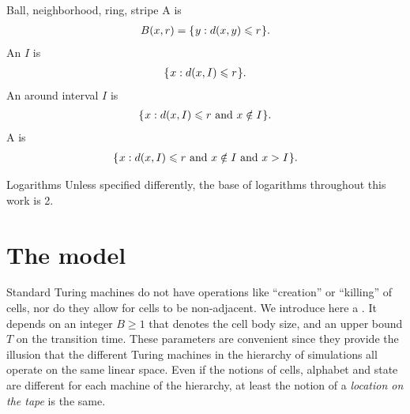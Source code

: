 \documentclass[12pt]{memoir}
\def\B{B}
\newcommand{\Tu}{T}
\begin{document}
\begin{flushdescription}
\item [Ball, neighborhood, ring, stripe]
A  is
\begin{align*}
    B(x,r)= \mathopen\{\mskip 1mu y : d(x,y)\leqslant r\mskip 1mu\mathclose\}.
\end{align*}
An  \( I \) is
\begin{align*}
    \mathopen\{\mskip 1mu x : d(x,I)\leqslant r\mskip 1mu\mathclose\}.
\end{align*}
An  around interval \( I \) is
\begin{align*}
    \mathopen\{\mskip 1mu x : d(x,I)\leqslant r \text{\rmfamily\mdseries\upshape{ and }} x \notin I\mskip 1mu\mathclose\}.
\end{align*}
A  is
\begin{align*}
    \mathopen\{\mskip 1mu x : d(x,I)\leqslant r \text{\rmfamily\mdseries\upshape{ and }} x \notin I \text{\rmfamily\mdseries\upshape{ and }} x>I\mskip 1mu\mathclose\}.
\end{align*}

\item[Logarithms] Unless specified differently,
the base of logarithms throughout this work is 2.

\end{flushdescription}


\section{The model}

Standard Turing machines do not have
operations like ``creation'' or ``killing'' of cells, nor
do they allow for cells to be non-adjacent.
We introduce here a .
It depends on an integer \( \B \ge 1 \) that denotes the cell body size,
and an upper bound \( \Tu \) on the transition time.
These parameters are convenient since they provide the illusion that the different Turing
machines in the hierarchy of simulations all operate on the same linear space.
Even if the notions of cells, alphabet
and state are different for each machine of the hierarchy, 
at least the notion of a \emph{location
on the tape} is the same.
\end{document}
